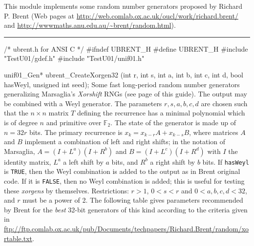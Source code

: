 
This module implements some random number generators proposed by Richard
  P. Brent (Web pages at %
\url{http://web.comlab.ox.ac.uk/oucl/work/richard.brent/}
and \url{http://wwwmaths.anu.edu.au/~brent/random.html}).


\bigskip
\hrule
\code\hide
/* ubrent.h for ANSI C */
#ifndef UBRENT_H
#define UBRENT_H
\endhide
#include "TestU01/gdef.h"
#include "TestU01/unif01.h"
\endcode

\code

unif01_Gen* ubrent_CreateXorgen32 (int r, int s, int a, int b, int c, int d,
                                   bool hasWeyl, unsigned int seed);
\endcode
  \tab Some fast long-period random number generators \cite{rBRE04a}
        generalizing Marsaglia's \textit{Xorshift} RNGs \cite{rMAR03a}
 (see page \pageref{marsa-xorshift} of this guide).  The
   output may be combined with a Weyl generator.
 The parameters $r, s, a, b,  c, d$ are chosen such that the $n \times n$
   matrix $T$ defining the recurrence has a minimal polynomial which
%
      is of degree $n$ and primitive over $\mathbb{F}_2$.
The state of the generator is made up of $n= 32 r$ bits.
The primary recurrence is $x_k = x_{k-r}A + x_{k-s}B$, where matrices
$A$ and $B$ implement a combination of left and right shifts;
 in the notation of Marsaglia, $A = (I + L^a)(I + R^b)$ and
 $B = (I + L^c)(I + R^d)$ with
 $I$ the identity matrix, $L^a$ a left shift by $a$ bits,
and $R^b$ a right shift by $b$ bits. If \texttt{hasWeyl} is \texttt{TRUE},
then the Weyl combination is added to the output as in Brent original
code. If it is  \texttt{FALSE}, then no Weyl combination is added;
 this is useful for testing these \textit{xorgens} by themselves.
Restrictions: $r > 1$, $0 < s < r$ and $0 < a,b,c,d < 32$,
and $r$ must be a power of 2.
%
The following table gives parameters recommended by Brent
for the \textit{best} 32-bit generators of this kind
according to the criteria given in \url{ftp://ftp.comlab.ox.ac.uk/pub/Documents/techpapers/Richard.Brent/random/xortable.txt}.
\endtab
%
